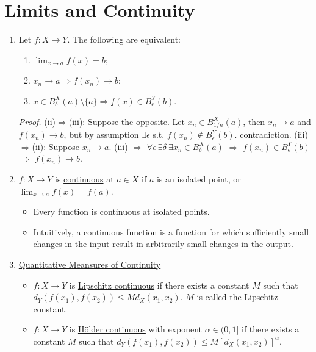 \documentclass[%
 aip,
 jmp,%
 amsmath,amssymb,
 reprint,%
]{revtex4-1}
\def\a{\alpha}
\def\d{\delta}
\def\e{\epsilon}
\renewenvironment{proof}{\color{gray}\footnotesize\emph{Proof.}}{}
\newcommand{\imply}{\Rightarrow}
\newcommand{\defn}[1]{\underline{#1}}
\begin{document}
\section {Limits and Continuity}
\begin{enumerate}
  \item Let $f: X \to Y$. The following are equivalent:
      \begin{enumerate}
        \item $\lim_{x \to a} f(x) = b$;
        \item $x_n \to a  \imply  f(x_n) \to b$;
        \item $x \in B_{\d}^{X}(a)\setminus\{a\} \imply f(x) \in B_{\e}^{Y}(b)$.
      \end{enumerate}
      \begin{proof}
        (ii)$\imply$(iii): Suppose the opposite. Let $x_n \in B_{1/n}^{X}(a)$,
        then $x_n \to a$ and $f(x_n) \to b$, but by assumption $\exists\e$ s.t.
        $f(x_n)\notin B_{\e}^{Y}(b)$. contradiction.
        (iii)$\imply$(ii): Suppose $x_n \to a$. (iii) $\imply$
        $\forall\e\ \exists\d\ \exists x_n\in B_{\d}^{X}(a)$ $\imply$
        $f(x_n)\in B_{\e}^{Y}(b)$ $\imply$ $f(x_n)\to b$.
      \end{proof}

  \item $f: X \to Y$ is \defn{continuous} at $a \in X$ if
  $a$ is an isolated point, or $\lim_{x\to a} f(x)=f(a)$.
      \begin{itemize}
        \item Every function is continuous at isolated points.
        \footnotesize
        \item Intuitively, a continuous function is a function for which
        sufficiently small changes in the input result in arbitrarily small
        changes in the output.
      \end{itemize}

  \item \defn{Quantitative Meansures of Continuity}
      \begin{itemize}
        \item $f:X \to Y$ is \defn{Lipschitz continuous} if there exists a
        constant $M$ such that $d_Y(f(x_1), f(x_2)) \leq M d_X(x_1,x_2)$.
        $M$ is called the Lipschitz constant.

        \item $f:X \to Y$ is \defn{H\"older continuous} with exponent $\a\in (0,1]$
        if there exists a constant $M$ such that
        $d_Y(f(x_1),f(x_2)) \leq M \left[d_X(x_1, x_2)\right]^{\a}$.
      \end{itemize}


\end{enumerate}
\end{document}
